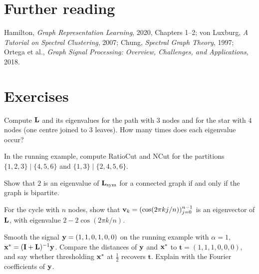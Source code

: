\begin{notechapter}
\section*{Further reading}
Hamilton, \emph{Graph Representation Learning}, 2020, Chapters 1--2; von Luxburg, \emph{A Tutorial on
Spectral Clustering}, 2007; Chung, \emph{Spectral Graph Theory}, 1997; Ortega et al., \emph{Graph Signal
Processing: Overview, Challenges, and Applications}, 2018.

\section*{Exercises}

\begin{exercise}\label{graph-laplacians:exr:1}
Compute $\mathbf{L}$ and its eigenvalues for the path with $3$ nodes and for the star with $4$ nodes (one centre
joined to $3$ leaves). How many times does each eigenvalue occur?
\end{exercise}

\begin{exercise}\label{graph-laplacians:exr:2}
In the running example, compute RatioCut and NCut for the partitions $\{1, 2, 3\}\mid\{4, 5, 6\}$ and $\{1, 3\}\mid\{2, 4, 5, 6\}$.
\end{exercise}

\begin{exercise}\label{graph-laplacians:exr:3}
Show that $2$ is an eigenvalue of $\mathbf{L}_{\text{sym}}$ for a connected graph if and only if the graph is bipartite.
\end{exercise}

\begin{exercise}\label{graph-laplacians:exr:4}
For the cycle with $n$ nodes, show that $\mathbf{v}_k = (\cos(2\pi kj/n))_{j=0}^{n-1}$ is an eigenvector of $\mathbf{L}$, with eigenvalue $2 - 2\cos(2\pi k/n)$.
\end{exercise}

\begin{exercise}\label{graph-laplacians:exr:5}
Smooth the signal $\mathbf{y} = (1, 1, 0, 1, 0, 0)$ on the running example with $\alpha = 1$, $\mathbf{x}^* = (\mathbf{I} + \mathbf{L})^{-1}\mathbf{y}$. Compare the distances of $\mathbf{y}$ and $\mathbf{x}^*$ to
$\mathbf t = (1, 1, 1, 0, 0, 0)$, and say whether thresholding $\mathbf{x}^*$ at $\frac12$ recovers $\mathbf t$. Explain with the Fourier coefficients of $\mathbf{y}$.
\end{exercise}
\end{notechapter}

